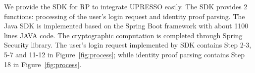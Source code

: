 We provide the SDK for RP to integrate UPRESSO easily. The SDK provides 2 functions:  %
processing of the user's login request and  identity proof parsing. The Java SDK is implemented based on the Spring Boot framework  with about 1100 lines JAVA code. The cryptographic computation is completed through Spring Security library.
The user's login request implemented by SDK contains Step 2-3, 5-7 and 11-12 in Figure~\ref{fig:process}; while identity proof parsing contains Step 18 in Figure~\ref{fig:process}.






\begin{comment}
\subsection{Prototype Implementation}

\noindent\textbf{Cross-Origin Resource Sharing (CORS).} The chrome extension needs to construct cross-origin requests to communicate with the RP and IdP, which is forbidden by default by the same-origin security policy. UPRESSO adopts CORS to achieve this cross-origin communication. In details, we requires the RP and IdP to specify \verb+chrome-extension://chrome-id+ in the \verb+Access-Control-Allow-Origin+ field of its response header, which makes the request pass the permission checks at the browser. As \verb+chrome-id+ is unique assigned by the Google, no other (malicious) entity can perform the cross-origin communication.

\noindent\textbf{307 Redirect. }It has been discussed in~\cite{FettKS16} that IdP might redirect the user to the RP immediately after the user inputs the credentials. For example, the HTTP response to the user's POST message with \verb+username+ and \verb+password+ might be the redirection to RP carrying user's identity proof. That is, as long as the 307 status code is used for this redirection, the user's credentials are also transmitted to the RP. However, in UPRESSO the redirections are intercepted by the user agent and rebuild the HTTP GET request to RP or IdP which is unable to leak the POST data of the user.



\noindent\textbf{Cross-Site Request Forgery (CSRF). } The CSRF attack might lead the user to access the malicious url provided by the adversary's web page, through which the adversary might lead the honest user to upload the adversary's \verb+ID token+ to the RP. However, in UPRESSO the cross origin request should be repudiated by both RP and IdP excepted the request from the origin of the user agent, which is able to prevent the CSRF attack.



\end{comment}
